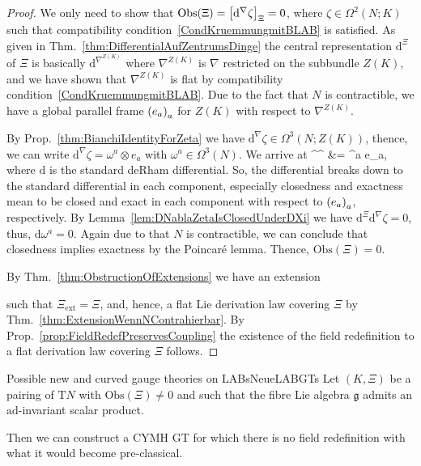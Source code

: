 \documentclass[preprint]{elsarticle}
\def\bas#1\eas{\begin{align*}#1\end{align*}}
\theoremstyle{plain}
\theoremstyle{remark}
\theoremstyle{definition}
\begin{document}
\begin{proof}
\leavevmode\newline
We only need to show that $\mathrm{Obs}(\Xi) = \mleft[ \mathrm{d}^\nabla \zeta \mright]_\Xi = 0$, where $\zeta \in \Omega^2(N; K)$ such that compatibility condition~\eqref{CondKruemmungmitBLAB} is satisfied. As given in Thm.~\ref{thm:DifferentialAufZentrumsDinge} the central representation $\mathrm{d}^\Xi$ of $\Xi$ is basically $\mathrm{d}^{\nabla^{Z(K)}}$ where $\nabla^{Z(K)}$ is $\nabla$ restricted on the subbundle $Z(K)$, and we have shown that $\nabla^{Z(K)}$ is flat by compatibility condition~\eqref{CondKruemmungmitBLAB}. Due to the fact that $N$ is contractible, we have a global parallel frame $\mleft( e_a \mright)_a$ for $Z(K)$ with respect to $\nabla^{Z(K)}$.

By Prop.~\ref{thm:BianchiIdentityForZeta} we have $\mathrm{d}^\nabla \zeta \in \Omega^3(N; Z(K))$, thence, we can write $\mathrm{d}^\nabla \zeta = \omega^a \otimes e_a$ with $\omega^a \in \Omega^3(N)$. We arrive at
\bas
\mathrm{d}^\Xi {}^\nabla \zeta
&=
\omega^a \otimes e_a,
\eas
where $\mathrm{d}$ is the standard deRham differential. So, the differential breaks down to the standard differential in each component, especially closedness and exactness mean to be closed and exact in each component with respect to $\mleft( e_a \mright)_a$, respectively. By Lemma~\ref{lem:DNablaZetaIsClosedUnderDXi} we have $\mathrm{d}^\Xi \mathrm{d}^\nabla \zeta=0$, thus, $\mathrm{d}\omega^a = 0$. Again due to that $N$ is contractible, we can conclude that closedness implies exactness by the Poincaré lemma. Thence, $\mathrm{Obs}(\Xi) = 0$.

By Thm.~\ref{thm:ObstructionOfExtensions} we have an extension
\begin{center}
\end{center}
such that $\Xi_{\mathrm{ext}} = \Xi$, and, hence, a flat Lie derivation law covering $\Xi$ by Thm.~\ref{thm:ExtensionWennNContrahierbar}. By Prop.~\ref{prop:FieldRedefPreservesCoupling} the existence of the field redefinition to a flat derivation law covering $\Xi$ follows.
\end{proof}

\begin{theorems}{Possible new and curved gauge theories on LABs}{NeueLABGTs}
Let $(K, \Xi)$ be a pairing of $\mathrm{T}N$ with $\mathrm{Obs}(\Xi) \neq 0$ and such that the fibre Lie algebra $\mathfrak{g}$ admits an $\mathrm{ad}$-invariant scalar product.

Then we can construct a CYMH GT for which there is no field redefinition with what it would become pre-classical.
\end{theorems}
\end{document}
